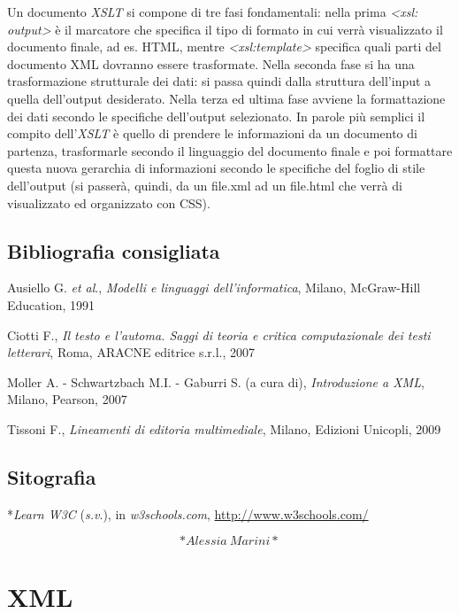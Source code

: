 \documentclass[
  b5paper,
  twoside,
  12pt,
  chapterprefix=false,
  bibliography=totocnumbered,
  parskip=false]{scrbook}
\begin{document}
Un documento \emph{XSLT} si compone di tre fasi fondamentali: nella prima
\emph{\textless xsl: output\textgreater{}} è il marcatore che specifica il tipo di formato in cui
verrà visualizzato il documento finale, ad es. HTML, mentre
\emph{\textless xsl:template\textgreater{}} specifica quali parti del documento XML dovranno
essere trasformate. Nella seconda fase si ha una trasformazione
strutturale dei dati: si passa quindi dalla struttura dell'input a
quella dell'output desiderato. Nella terza ed ultima fase avviene la
formattazione dei dati secondo le specifiche dell'output selezionato. In
parole più semplici il compito dell'\emph{XSLT} è quello di prendere le
informazioni da un documento di partenza, trasformarle secondo il
linguaggio del documento finale e poi formattare questa nuova gerarchia
di informazioni secondo le specifiche del foglio di stile dell'output
(si passerà, quindi, da un file.xml ad un file.html che verrà di
visualizzato ed organizzato con CSS).

\hypertarget{bibliografia-consigliata-27}{%
\section*{Bibliografia consigliata}\label{bibliografia-consigliata-27}}

Ausiello G. \emph{et al}., \emph{Modelli e linguaggi dell'informatica}, Milano,
McGraw-Hill Education, 1991

Ciotti F., \emph{Il testo e l'automa. Saggi di teoria e critica
computazionale dei testi letterari}, Roma, ARACNE editrice s.r.l., 2007

Moller A. - Schwartzbach M.I. - Gaburri S. (a cura di), \emph{Introduzione a
XML}, Milano, Pearson, 2007

Tissoni F., \emph{Lineamenti di editoria multimediale}, Milano, Edizioni
Unicopli, 2009

\hypertarget{sitografia-34}{%
\section*{Sitografia}\label{sitografia-34}}

*\emph{Learn W3C} (\emph{s.v}.), in \emph{w3schools.com},
\url{http://www.w3schools.com/}

\[*Alessia~Marini*\]

\hypertarget{xml}{%
\chapter{XML}\label{xml}}
\end{document}
